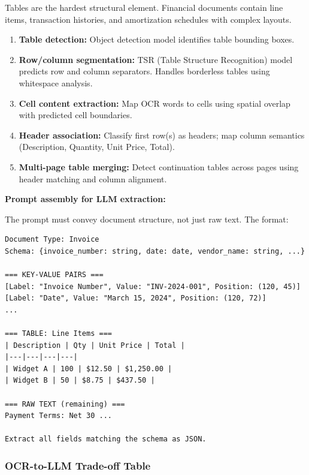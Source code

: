 Tables are the hardest structural element. Financial documents contain line items, transaction histories, and amortization schedules with complex layouts.

\begin{enumerate}
  \item \textbf{Table detection:} Object detection model identifies table bounding boxes.
  \item \textbf{Row/column segmentation:} TSR (Table Structure Recognition) model predicts row and column separators. Handles borderless tables using whitespace analysis.
  \item \textbf{Cell content extraction:} Map OCR words to cells using spatial overlap with predicted cell boundaries.
  \item \textbf{Header association:} Classify first row(s) as headers; map column semantics (Description, Quantity, Unit Price, Total).
  \item \textbf{Multi-page table merging:} Detect continuation tables across pages using header matching and column alignment.
\end{enumerate}

\textbf{Prompt assembly for LLM extraction:}

The prompt must convey document structure, not just raw text. The format:

\begin{verbatim}
Document Type: Invoice
Schema: {invoice_number: string, date: date, vendor_name: string, ...}

=== KEY-VALUE PAIRS ===
[Label: "Invoice Number", Value: "INV-2024-001", Position: (120, 45)]
[Label: "Date", Value: "March 15, 2024", Position: (120, 72)]
...

=== TABLE: Line Items ===
| Description | Qty | Unit Price | Total |
|---|---|---|---|
| Widget A | 100 | $12.50 | $1,250.00 |
| Widget B | 50 | $8.75 | $437.50 |

=== RAW TEXT (remaining) ===
Payment Terms: Net 30 ...

Extract all fields matching the schema as JSON.
\end{verbatim}

\subsubsection*{OCR-to-LLM Trade-off Table}

